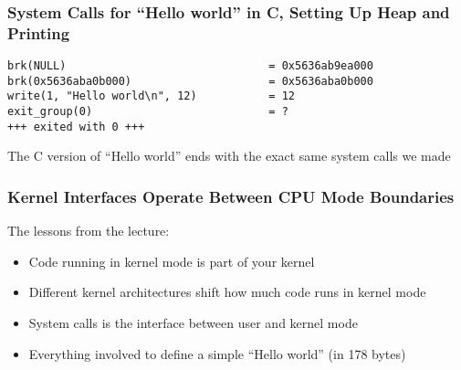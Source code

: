   \begin{frame}[fragile]
    \frametitle{System Calls for ``Hello world'' in C, Setting Up Heap and
                Printing}

    \begin{lstlisting}
brk(NULL)                               = 0x5636ab9ea000
brk(0x5636aba0b000)                     = 0x5636aba0b000
write(1, "Hello world\n", 12)           = 12
exit_group(0)                           = ?
+++ exited with 0 +++
    \end{lstlisting}

    \vspace{1em}
    The C version of ``Hello world'' ends with the exact same system calls we
    made
  \end{frame}


  \begin{frame}
    \frametitle{Kernel Interfaces Operate Between CPU Mode Boundaries}

    The lessons from the lecture:
    \begin{itemize}
      \item Code running in kernel mode is part of your kernel
      \item Different kernel architectures shift how much code runs in kernel mode
      \item System calls is the interface between user and kernel mode
      \item Everything involved to define a simple ``Hello world'' (in 178 bytes)
    \end{itemize}
  \end{frame}


